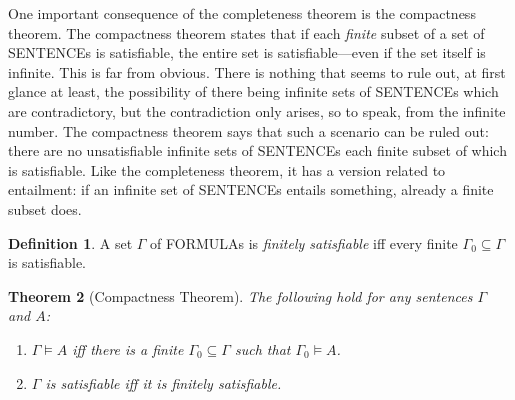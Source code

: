 \documentclass[10pt,a4paper]{article}
\newcommand*{\olup}[1]{\MakeUppercase{#1}}
\theoremstyle{plain}
\newtheorem{thm}{Theorem}[section]
\theoremstyle{definition}
\newtheorem{defn}[thm]{Definition}
\theoremstyle{remark}
\newcommand*{\ollabel}[1]{\label{#1}}
\providecommand{\Entails}{\mathrel{\models}}
\begin{document}
One important consequence of the completeness theorem is the
compactness theorem.  The compactness theorem states that if each
\emph{finite} subset of a set of \olup{sentence}s is satisfiable, the
entire set is satisfiable---even if the set itself is infinite. This
is far from obvious. There is nothing that seems to rule out, at first
glance at least, the possibility of there being infinite sets of
\olup{sentence}s which are contradictory, but the contradiction only
arises, so to speak, from the infinite number.  The compactness
theorem says that such a scenario can be ruled out: there are no
unsatisfiable infinite sets of \olup{sentence}s each finite subset of
which is satisfiable. Like the completeness theorem, it has a version
related to entailment: if an infinite set of \olup{sentence}s entails
something, already a finite subset does.

\begin{defn}
  A set $\Gamma$ of \olup{formula}s is \emph{finitely satisfiable} iff every finite $\Gamma_0 \subseteq \Gamma$ is satisfiable.
\end{defn}

\begin{thm}[Compactness Theorem]
\ollabel{thm:compactness}
The following hold for any sentences $\Gamma$ and $A$:
\begin{enumerate}
  \item $\Gamma \Entails A$ iff there is a finite $\Gamma_0
    \subseteq \Gamma$ such that $\Gamma_0 \Entails A$.
  \item $\Gamma$ is satisfiable iff it is finitely
    satisfiable.
\end{enumerate}
\end{thm}
\end{document}
